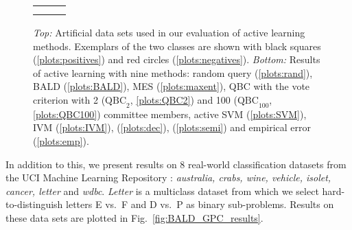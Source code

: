 \begin{figure}
	\begin{center}
	\begin{tabular}{ccc}
	&
	&
	\\
	&
	&
	 \\
	\end{tabular}
	\end{center}
	\caption[Evaluation of Bayesian active learning on artificial data sets]{\emph{Top:} Artificial data sets used in our evaluation of active learning methods. Exemplars of the two classes are shown with black squares (\ref{plots:positives}) and red circles (\ref{plots:negatives}). \emph{Bottom:} Results of active learning with nine methods: random query (\ref{plots:rand}), BALD (\ref{plots:BALD}),  MES (\ref{plots:maxent}), QBC with the vote criterion with 2 ($\mbox{QBC}_2$, \ref{plots:QBC2}) and 100 ($\mbox{QBC}_{100}$, \ref{plots:QBC100}) committee members, active SVM (\ref{plots:SVM}), IVM (\ref{plots:IVM}), \citet{Kapoor2007} (\ref{plots:dec}), \citet{Zhu2003} (\ref{plots:semi}) and empirical error (\ref{plots:emp}).}
	\label{fig:artificial}
\end{figure}

In addition to this, we present results on 8 real-world classification datasets from the UCI Machine Learning Repository \citep{UCIRepository}: \emph{australia, crabs, wine, vehicle, isolet, cancer, letter} and \emph{wdbc}. \emph{Letter} is a multiclass dataset from which we select hard-to-distinguish letters E vs.\ F and D vs.\ P as binary sub-problems. Results on these data sets are plotted in Fig.\ \ref{fig:BALD_GPC_results}.

